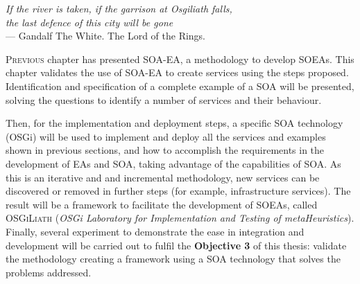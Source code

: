 \label{chap:osgiliath}



\begin{flushright}{\slshape
  If the river is taken, if the garrison at Osgiliath falls, 
  \\ the last defence of this city will be gone } \\ \medskip
    --- {Gandalf The White. The Lord of the Rings.}
\end{flushright}


\minitoc\mtcskip
\vfill


\lettrine{P}{revious} chapter has presented SOA-EA, a methodology to develop SOEAs. This chapter validates the use of SOA-EA to create services using the steps proposed. Identification and specification of a complete example of a SOA will be presented, solving the questions to identify a number of services and their behaviour.

Then, for the implementation and deployment steps, a specific SOA technology (OSGi) will be used to implement and deploy all the services and examples shown in previous sections, and how to accomplish the requirements in the development of EAs and SOA, taking advantage of the capabilities of SOA. As this is an iterative and and incremental methodology, new services can be discovered or removed in further steps (for example, infrastructure services). The result will be a framework to facilitate the development of SOEAs, called \textsc{OSGiLiath} ({\em OSGi Laboratory for Implementation and
 Testing of metaHeuristics}). Finally, several experiment to demonstrate the ease in integration and development will be carried out to fulfil the \textbf{Objective 3} of this thesis: validate the methodology creating a framework using a SOA technology that solves the problems addressed.

